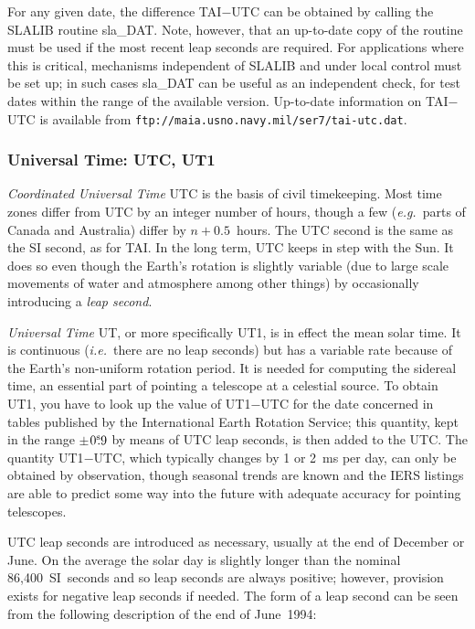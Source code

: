 \documentclass[11pt,twoside]{article}
\newcommand{\tseci}[1]   {$#1$\mbox{$^{\rm s}$}}
\newcommand{\tsec}[2]    {\tseci{#1}$\hspace{-0.3em}.#2$}
\renewcommand{\tsec}[2] {$#1^{\rm s}\hspace{-0.3em}.#2$}
\begin{document}
For any given date, the difference TAI$-$UTC
can be obtained by calling the SLALIB routine
sla\_DAT.
Note, however, that an up-to-date copy of the routine must be used if
the most recent leap seconds are required.  For applications
where this is critical, mechanisms independent of SLALIB
and under local control must
be set up;  in such cases
sla\_DAT
can be useful as an
independent check, for test dates within the range of the
available version.  Up-to-date information on TAI$-$UTC is available
from {\tt ftp://maia.usno.navy.mil/ser7/tai-utc.dat}.

\subsubsection{Universal Time: UTC, UT1}
{\it Coordinated Universal Time}\/ UTC is the basis of civil timekeeping.
Most time zones differ from UTC by an integer number
of hours, though a few ({\it e.g.}\ parts of Canada and Australia) differ
by $n+0.5$~hours.  The UTC second is the same as the SI second,
as for TAI.  In the long term, UTC keeps in step with the
Sun.  It does so even though the Earth's rotation is slightly
variable (due to large scale movements of water and atmosphere
among other things) by occasionally introducing a {\it leap
second}.

{\it Universal Time}\/ UT, or more specifically UT1,
is in effect the mean solar time.  It is continuous
({\it i.e.}\ there are no leap seconds) but has a variable
rate because of the Earth's non-uniform rotation period.  It is
needed for computing the sidereal time, an essential part of
pointing a telescope at a celestial source.  To obtain UT1, you
have to look up the value of UT1$-$UTC for the date concerned
in tables published by the International Earth Rotation
Service;  this quantity, kept in the range
$\pm$\tsec{0}{9} by means of UTC leap
seconds, is then added to the UTC.  The quantity UT1$-$UTC,
which typically changes by 1 or 2~ms per day,
can only be obtained by observation, though seasonal trends
are known and the IERS listings are able to predict some way into
the future with adequate accuracy for pointing telescopes.

UTC leap seconds are introduced as necessary,
usually at the end of December or June.
On the average the solar day is slightly longer
than the nominal 86,400~SI~seconds and so leap seconds are always positive;
however, provision exists for negative leap seconds if needed.
The form of a leap second can be seen from the
following description of the end of June~1994:
\end{document}
